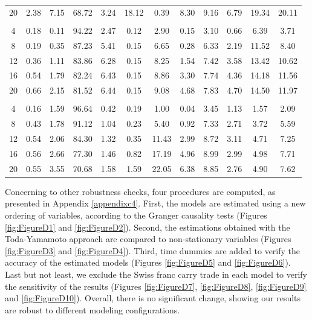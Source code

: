 \documentclass[a4paper, twoside]{templates/ociamthesis}
\begin{document}
\begin{table}[!ht]
{\begin{tabular}[t]{cccccccccccc}
\hspace{1em}20 & 2.38 & 7.15 & 68.72 & 3.24 & 18.12 & 0.39 & 8.30 & 9.16 & 6.79 & 19.34 & 20.11\\
\addlinespace[0.3em]
\multicolumn{12}{l}{\textbf{JPY model}}\\
\hspace{1em}4 & 0.18 & 0.11 & 94.22 & 2.47 & 0.12 & 2.90 & 0.15 & 3.10 & 0.66 & 6.39 & 3.71\\
\hspace{1em}8 & 0.19 & 0.35 & 87.23 & 5.41 & 0.15 & 6.65 & 0.28 & 6.33 & 2.19 & 11.52 & 8.40\\
\hspace{1em}12 & 0.36 & 1.11 & 83.86 & 6.28 & 0.15 & 8.25 & 1.54 & 7.42 & 3.58 & 13.42 & 10.62\\
\hspace{1em}16 & 0.54 & 1.79 & 82.24 & 6.43 & 0.15 & 8.86 & 3.30 & 7.74 & 4.36 & 14.18 & 11.56\\
\hspace{1em}20 & 0.66 & 2.15 & 81.52 & 6.44 & 0.15 & 9.08 & 4.68 & 7.83 & 4.70 & 14.50 & 11.97\\
\addlinespace[0.3em]
\multicolumn{12}{l}{\textbf{GBP model}}\\
\hspace{1em}4 & 0.16 & 1.59 & 96.64 & 0.42 & 0.19 & 1.00 & 0.04 & 3.45 & 1.13 & 1.57 & 2.09\\
\hspace{1em}8 & 0.43 & 1.78 & 91.12 & 1.04 & 0.23 & 5.40 & 0.92 & 7.33 & 2.71 & 3.72 & 5.59\\
\hspace{1em}12 & 0.54 & 2.06 & 84.30 & 1.32 & 0.35 & 11.43 & 2.99 & 8.72 & 3.11 & 4.71 & 7.25\\
\hspace{1em}16 & 0.56 & 2.66 & 77.30 & 1.46 & 0.82 & 17.19 & 4.96 & 8.99 & 2.99 & 4.98 & 7.71\\
\hspace{1em}20 & 0.55 & 3.55 & 70.68 & 1.58 & 1.59 & 22.05 & 6.38 & 8.85 & 2.76 & 4.90 & 7.62\\
\bottomrule
\end{tabular}}
\end{table}

Concerning to other robustness checks, four procedures are computed, as presented in Appendix \ref{appendixc4}. First, the models are estimated using a new ordering of variables, according to the Granger causality tests (Figures \ref{fig:FigureD1} and \ref{fig:FigureD2}). Second, the estimations obtained with the Toda-Yamamoto approach are compared to non-stationary variables (Figures \ref{fig:FigureD3} and \ref{fig:FigureD4}). Third, time dummies are added to verify the accuracy of the estimated models (Figures \ref{fig:FigureD5} and \ref{fig:FigureD6}). Last but not least, we exclude the Swiss franc carry trade in each model to verify the sensitivity of the results (Figures \ref{fig:FigureD7}, \ref{fig:FigureD8}, \ref{fig:FigureD9} and \ref{fig:FigureD10}). Overall, there is no significant change, showing our results are robust to different modeling configurations.
\end{document}
